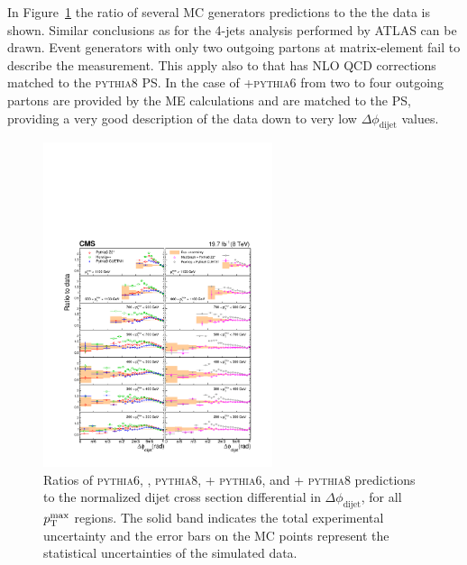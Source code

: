 \documentclass{PoS}
\providecommand{\dphi}{\ensuremath{\Delta\phi_\text{dijet}}\xspace}
\providecommand{\ptmax}{\ensuremath{\pt^{\text{max}}}\xspace}
\providecommand{\PYTHIAS} {{\textsc{pythia6}}\xspace}
\providecommand{\PYTHIAE} {{\textsc{pythia8}}\xspace}
\begin{document}
In Figure~\ref{fig:dijet_ratios_MC_data} the ratio of several MC generators predictions to
the the data is shown. Similar conclusions as for the 4-jets analysis performed by ATLAS can be drawn. Event generators with only two outgoing
partons at matrix-element fail to describe the measurement. This apply also to \POWHEG that has NLO 
QCD corrections matched to the \PYTHIAE PS. In the case of \MADGRAPH+\PYTHIAS from two to four outgoing partons are
provided by the ME calculations and are matched to the PS, providing a very good description of the data down to very
low \dphi values.  

\begin{figure}[hbtp]
  \centering
  \includegraphics[width=0.6\textwidth]{Figure8.pdf}
  \caption{Ratios of \PYTHIAS, \HERWIGpp, \PYTHIAE, \MADGRAPH + \PYTHIAS, and
    \POWHEG + \PYTHIAE predictions to the normalized dijet cross
    section differential in \dphi, for all \ptmax regions.
    The solid band indicates the total experimental uncertainty and
    the error bars on the MC points represent the statistical
    uncertainties of the simulated data.}
  \label{fig:dijet_ratios_MC_data}
\end{figure}
\end{document}
